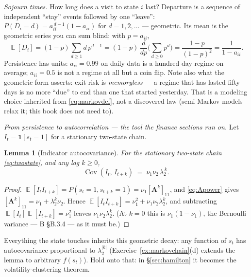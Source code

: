 \documentclass[11pt]{article}
\numberwithin{equation}{section}
\theoremstyle{plain}
\newtheorem{lemma}[theorem]{Lemma}
\theoremstyle{definition}
\theoremstyle{remark}
\DeclareMathOperator{\E}{\mathbb{E}}
\DeclareMathOperator{\Cov}{Cov}
\newcommand{\bA}{\bm{A}}
\begin{document}
\emph{Sojourn times.} How long does a visit to state $i$ last? Departure is a sequence of independent ``stay'' events followed by one ``leave'': $P(D_i = d) = a_{ii}^{\,d-1}(1 - a_{ii})$ for $d = 1, 2, \dots$ --- geometric. Its mean is the geometric series you can sum blind: with $p = a_{ii}$,
\begin{equation}
\E[D_i] = (1 - p)\sum_{d \ge 1} d\, p^{d-1}
= (1-p)\,\frac{d}{dp}\Big(\sum_{d \ge 0} p^{d}\Big)
= \frac{1 - p}{(1-p)^2}
= \frac{1}{1 - a_{ii}} .
\label{eq:sojourn}
\end{equation}
Persistence has units: $a_{ii} = 0.99$ on daily data is a hundred-day regime on average; $a_{ii} = 0.5$ is not a regime at all but a coin flip. Note also what the geometric form asserts: exit risk is \emph{memoryless} --- a regime that has lasted fifty days is no more ``due'' to end than one that started yesterday. That is a modeling choice inherited from \eqref{eq:markovdef}, not a discovered law (semi-Markov models relax it; this book does not need to).

\emph{From persistence to autocorrelation --- the tool the finance sections run on.} Let $I_t = \mathbf{1}[s_t = 1]$ for a stationary two-state chain.

\begin{lemma}[Indicator autocovariance]\label{lem:indcov}
For the stationary two-state chain \eqref{eq:twostate}, and any lag $k \ge 0$,
\[
\Cov(I_t,\, I_{t+k}) \;=\; \nu_1 \nu_2\, \lambda_2^{\,k}.
\]
\end{lemma}
\begin{proof}
$\E[I_t I_{t+k}] = P(s_t = 1, s_{t+k} = 1) = \nu_1 [\bA^k]_{11}$, and \eqref{eq:Apower} gives $[\bA^k]_{11} = \nu_1 + \lambda_2^k \nu_2$. Hence $\E[I_t I_{t+k}] = \nu_1^2 + \nu_1\nu_2 \lambda_2^k$, and subtracting $\E[I_t]\E[I_{t+k}] = \nu_1^2$ leaves $\nu_1\nu_2\lambda_2^k$. (At $k = 0$ this is $\nu_1(1 - \nu_1)$, the Bernoulli variance --- B \S B.3.4 --- as it must be.)
\end{proof}

Everything the state touches inherits this geometric decay: any function of $s_t$ has autocovariance proportional to $\lambda_2^{|k|}$ (Exercise~\ref{ex:markovchain}(d) extends the lemma to arbitrary $f(s_t)$). Hold onto that: in \S\ref{sec:hamilton} it becomes the volatility-clustering theorem.
\end{document}
